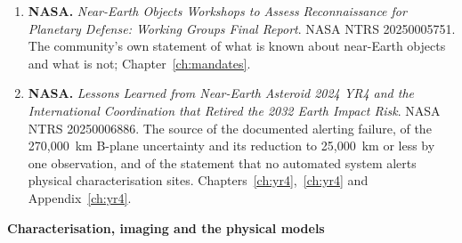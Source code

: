 \begin{enumerate}[leftmargin=2.9em,itemsep=4pt]
\item \textbf{NASA.} \emph{Near-Earth Objects Workshops to Assess
Reconnaissance for Planetary Defense: Working Groups Final Report}. NASA
NTRS 20250005751. The community's own statement of what is known about
near-Earth objects and what is not; Chapter~\ref{ch:mandates}.

\item \textbf{NASA.} \emph{Lessons Learned from Near-Earth Asteroid 2024 YR4
and the International Coordination that Retired the 2032 Earth Impact Risk}.
NASA NTRS 20250006886. The source of the documented alerting failure, of the
270,000~km B-plane uncertainty and its reduction to 25,000~km or less by one
observation, and of the statement that no automated system alerts physical
characterisation sites. Chapters~\ref{ch:yr4},~\ref{ch:yr4} and
Appendix~\ref{ch:yr4}.

\end{enumerate}

\vspace{8pt}
{\sffamily\bfseries\small Characterisation, imaging and the physical models}


